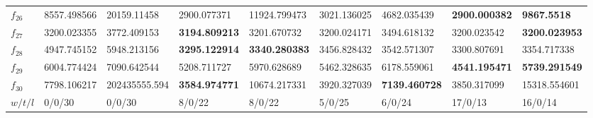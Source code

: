 \begin{table*}[h!]
\begin{tabular}{|p{0.8cm}|p{1.6cm}|p{1.6cm}|p{1.6cm}|p{1.6cm}|p{1.6cm}|p{1.6cm}|p{1.6cm}|p{1.6cm}|}
$f_{26}$  & 8557.498566 & 20159.11458 & 2900.077371 & 11924.799473 & 3021.136025 & 4682.035439 & \textbf{2900.000382} & \textbf{9867.5518} \\ 
$f_{27}$  & 3200.023355 & 3772.409153 & \textbf{3194.809213} & 3201.670732 & 3200.024171 & 3494.618132 & 3200.023542 & \textbf{3200.023953} \\ 
$f_{28}$  & 4947.745152 & 5948.213156 & \textbf{3295.122914} & \textbf{3340.280383} & 3456.828432 & 3542.571307 & 3300.807691 & 3354.717338 \\ 
$f_{29}$  & 6004.774424 & 7090.642544 & 5208.711727 & 5970.628689 & 5462.328635 & 6178.559061 & \textbf{4541.195471} & \textbf{5739.291549} \\ 
$f_{30}$  & 7798.106217 & 202435555.594 & \textbf{3584.974771} & 10674.217331 & 3920.327039 & \textbf{7139.460728} & 3850.317099 & 15318.554601 \\ 
\hline
$w/t/l$  & 0/0/30 & 0/0/30 & 8/0/22 & 8/0/22 & 5/0/25 & 6/0/24 & 17/0/13 & 16/0/14 \\
\hline

 \end{tabular}
\end{table*}
\endgroup
